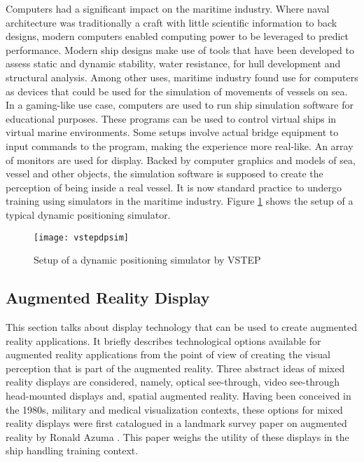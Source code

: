 Computers had a significant impact on the maritime industry. Where naval architecture was traditionally a craft with little scientific information to back designs, modern computers enabled computing power to be leveraged to predict performance. Modern ship designs make use of tools that have been developed to assess static and dynamic stability, water resistance, for hull development and structural analysis. Among other uses, maritime industry found use for computers as devices that could be used for the simulation of movements of vessels on sea. In a gaming-like use case, computers are used to run ship simulation software for educational purposes. These programs can be used to control virtual ships in virtual marine environments. Some setups involve actual bridge equipment to input commands to the program, making the experience more real-like. An array of monitors are used for display. Backed by computer graphics and models of sea, vessel and other objects, the simulation software is supposed to create the perception of being inside a real vessel. It is now standard practice to undergo training using simulators in the maritime industry. Figure \ref{fig:vstepdpsim} shows the setup of a typical dynamic positioning simulator. 


\begin{figure}
	\centering
	\texttt{[image: vstepdpsim]}
	\caption{Setup of a dynamic positioning simulator by VSTEP}
	\label{fig:vstepdpsim}
\end{figure}


\subsection{Augmented Reality Display}
This section talks about display technology that can be used to create augmented reality applications.%
It briefly describes technological options available for augmented reality applications from the point of view of creating the visual perception that is part of the augmented reality. Three abstract ideas of mixed reality displays are considered, namely, optical see-through, video see-through head-mounted displays and, spatial augmented reality. Having been conceived in the 1980s, military and medical visualization contexts, these options for mixed reality displays were first catalogued in a landmark survey paper on augmented reality by Ronald Azuma \cite{azuma1997survey}. This paper weighs the utility of these displays in the ship handling training context.  

